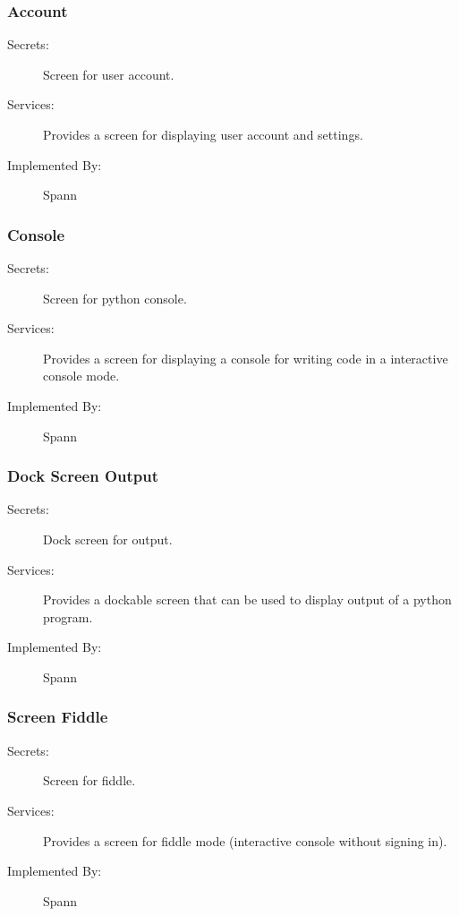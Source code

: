 \documentclass[12pt, titlepage]{article}
\begin{document}
\subsubsection{Account}

\begin{description}
\item[Secrets:] Screen for user account.
\item[Services:] Provides a screen for displaying user account and settings.
\item[Implemented By:] Spann
\end{description}

\subsubsection{Console}

\begin{description}
\item[Secrets:] Screen for python console.
\item[Services:] Provides a screen for displaying a console for writing code
    in a interactive console mode.
\item[Implemented By:] Spann
\end{description}

\subsubsection{Dock Screen Output}

\begin{description}
\item[Secrets:] Dock screen for output.
\item[Services:] Provides a dockable screen that can be used to display output
    of a python program.
\item[Implemented By:] Spann
\end{description}

\subsubsection{Screen Fiddle}

\begin{description}
\item[Secrets:] Screen for fiddle.
\item[Services:] Provides a screen for fiddle mode (interactive console without
    signing in).
\item[Implemented By:] Spann
\end{description}
\end{document}
